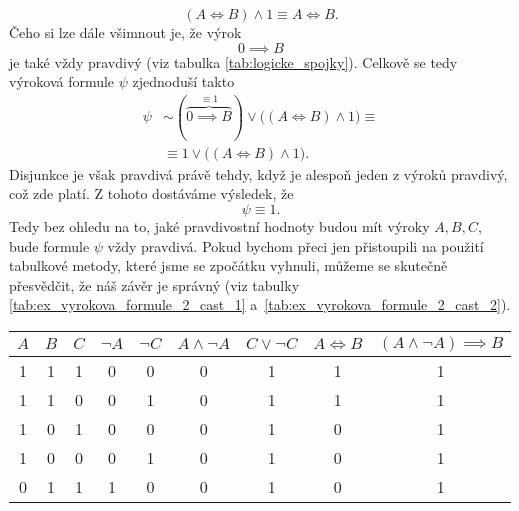 \begin{example}
\begin{solution}
        \begin{equation*}
            (A \iff B) \land 1 \equiv  A \iff B.
        \end{equation*}
        Čeho si lze dále všimnout je, že výrok
        \begin{equation*}
            0 \implies B
        \end{equation*}
        je také vždy pravdivý (viz tabulka \ref{tab:logicke_spojky}). Celkově se tedy výroková formule $\psi$ zjednoduší takto
        \begin{align*}
            \psi&\sim (\overbrace{0 \implies B}^{\equiv 1}) \lor \bigl((A \iff B) \land 1\bigr)\equiv  \\ &\equiv 1 \lor \bigl((A \iff B) \land 1\bigr).
        \end{align*}
        Disjunkce je však pravdivá právě tehdy, když je alespoň jeden z výroků pravdivý, což zde platí. Z tohoto dostáváme výsledek, že
        \begin{equation*}
            \psi\equiv 1.
        \end{equation*}
        Tedy bez ohledu na to, jaké pravdivostní hodnoty budou mít výroky $A,B,C$, bude formule $\psi$ vždy pravdivá. Pokud bychom přeci jen přistoupili na použití tabulkové metody, které jsme se zpočátku vyhnuli, můžeme se skutečně přesvědčit, že náš závěr je správný (viz tabulky \ref{tab:ex_vyrokova_formule_2_cast_1} a~\ref{tab:ex_vyrokova_formule_2_cast_2}).
        \begin{table}[h]
            \centering
            \begin{tabular}{|ccc|cccccc|}
            \hline
            $A$ & $B$ & $C$ & $\neg A$ & $\neg C$ & $A \land \neg A$ & $C \lor \neg C$ & $A \iff B$ & $(A \land \neg A) \implies B$ \\ \hline
            1   & 1   & 1   & 0        & 0        & 0                & 1                 & 1          & 1                             \\
            1   & 1   & 0   & 0        & 1        & 0                & 1                 & 1          & 1                             \\
            1   & 0   & 1   & 0        & 0        & 0                & 1                 & 0          & 1                             \\
            1   & 0   & 0   & 0        & 1        & 0                & 1                 & 0          & 1                             \\
            0   & 1   & 1   & 1        & 0        & 0                & 1                 & 0          & 1                             \\

\end{tabular}
\end{table}
\end{solution}
\end{example}
